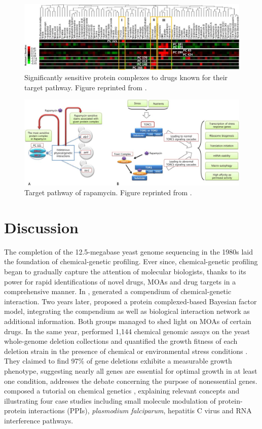 \documentclass[12pt,fullpage,singlespace]{article}
\begin{document}
\begin{figure}
\centering
\includegraphics[width=\linewidth]{1079-4.png}
\caption{Significantly sensitive protein complexes to drugs known for their target pathway. Figure reprinted from \citep{1079}.}
\label{fig:1079-4}
\end{figure}

\begin{figure}
\centering
\includegraphics[width=\linewidth]{1079-5.png}
\caption{Target pathway of rapamycin. Figure reprinted from \citep{1079}.}
\label{fig:1079-5}
\end{figure}

\section{Discussion}

The completion of the 12.5-megabase yeast genome sequencing in the 1980s laid the foundation of chemical-genetic profiling. Ever since, chemical-genetic profiling began to gradually capture the attention of molecular biologists, thanks to its power for rapid identifications of novel drugs, MOAs and drug targets in a comprehensive manner. In \citeyear{1078},  generated a compendium of chemical-genetic interaction. Two years later,  proposed a protein complexed-based Bayesian factor model, integrating the compendium as well as biological interaction network as additional information. Both groups managed to shed light on MOAs of certain drugs. In the same year,  performed 1,144 chemical genomic assays on the yeast whole-genome deletion collections and quantified the growth fitness of each deletion strain in the presence of chemical or environmental stress conditions \citep{1080}. They claimed to find 97\% of gene deletions exhibite a measurable growth phenotype, suggesting nearly all genes are essential for optimal growth in at least one condition, addresses the debate concerning the purpose of nonessential genes.  composed a tutorial on chemical genetics \citep{1103}, explaining relevant concepts and illustrating four case studies including small molecule modulation of protein-protein interactions (PPIs), \textit{plasmodium falciparum}, hepatitis C virus and RNA interference pathways.
\end{document}
